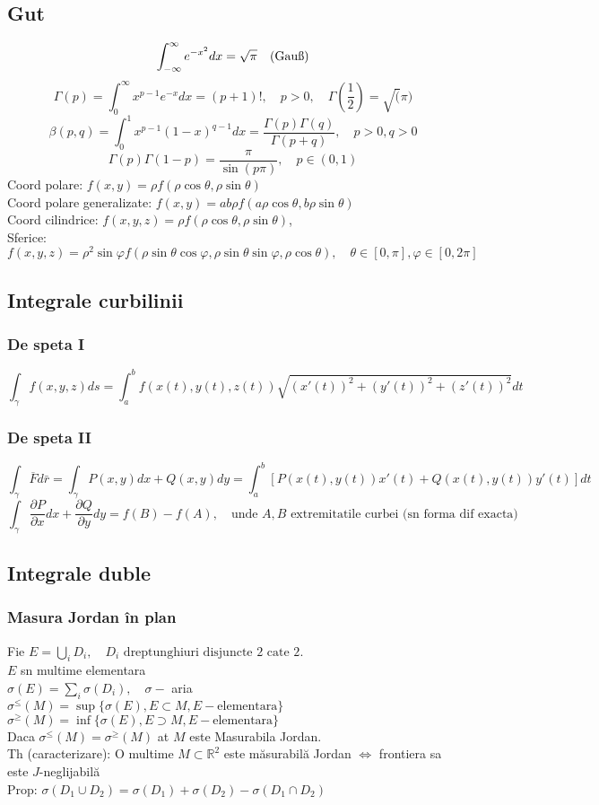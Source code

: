 \documentclass{article}
\newcommand{\parti}[2]{\frac{\partial #1}{ \partial #2}}
\newcommand*{\R}{\mathbb{R}}
\begin{document}
\subsection*{Gut}
\[ \int_{-\infty}^{\infty}e^{-x^2}dx = \sqrt{\pi} \text{\quad(Gauß)} \]
\[ \Gamma(p) = \int_0^{\infty} x^{p-1}e^{-x}dx = (p+1)!, \quad p > 0, \quad \Gamma(\frac{1}{2}) = \sqrt(\pi)  \]
\[ \beta(p, q) = \int_0^{1} x^{p-1}(1-x)^{q-1}dx = \frac{\Gamma(p)\Gamma(q)}{\Gamma(p+q)}, \quad p > 0, q > 0 \]
\[ \Gamma(p)\Gamma(1-p)= \frac{\pi}{\sin(p\pi)}, \quad p \in (0, 1) \]
Coord polare: $f(x,y) = \rho f(\rho \cos \theta, \rho \sin\theta)$ \\
Coord polare generalizate: $f(x,y) = ab\rho f(a\rho\cos\theta, b\rho\sin\theta) $\\
Coord cilindrice: $f(x, y, z) = \rho f(\rho\cos\theta, \rho\sin\theta)$, \\
Sferice: $f(x, y,z) = \rho^2\sin\varphi f(\rho \sin\theta\cos\varphi, \rho\sin\theta\sin\varphi, \rho\cos\theta),\quad \theta \in [0, \pi], \varphi \in[0, 2\pi]$\\
\subsection*{Integrale curbilinii}
\subsubsection*{De speta I}
\[ \int_{\gamma} f(x, y, z)ds = \int_a^bf(x(t), y(t), z(t)) \sqrt{(x'(t))^2+(y'(t))^2+(z'(t))^2} dt \]
\subsubsection*{De speta II}
\[ \int_{\gamma}\overline{F}d\bar{r} = \int_{\gamma} P(x,y) dx+ Q(x,y)dy = \int_a^b \left[P(x(t), y(t))x'(t) + Q(x(t), y(t)) y'(t) \right]dt \]
\[ \int_{\gamma} \parti{P}{x}dx+\parti{Q}{y}dy = f(B)- f(A), \quad \text{unde $A, B$ extremitatile curbei (sn forma dif exacta) } \]
\subsection*{Integrale duble}
\subsubsection*{Masura Jordan în plan}
Fie $E = \bigcup_i D_i, \quad D_i \text{ dreptunghiuri disjuncte 2 cate 2}$.\\
$E$ sn multime elementara\\
$\sigma(E) = \sum_i \sigma(D_i), \quad \sigma - $ aria\\
$\sigma^{\le}(M)=\sup\{\sigma(E), E \subset M, E -\text{elementara} \}$\\
$\sigma^{\ge}(M)=\inf\{\sigma(E), E \supset M, E -\text{elementara} \}$\\
Daca $\sigma^{\le}(M)=\sigma^{\ge}(M) $ at $M$ este Masurabila Jordan.\\
Th (caracterizare): O multime $M \subset \R^2$ este măsurabilă Jordan $\iff$ frontiera sa este $J$-neglijabilă\\
Prop: $\sigma(D_1\cup D_2) = \sigma(D_1) + \sigma(D_2) - \sigma(D_1\cap D_2)$
\end{document}
